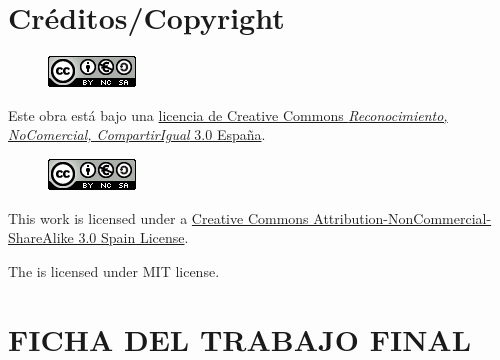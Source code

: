 \setcounter{page}{1} 
\pagestyle{plain}

\chapter*{Créditos/Copyright}

\vspace{1cm}

\begin{figure}[ht]
    \centering
	\includegraphics[scale=1]{images/license.png}
\end{figure}

Este obra está bajo una \href{http://creativecommons.org/licenses/by-nc-sa/3.0/es/}{licencia de Creative Commons \textit{Reconocimiento, NoComercial, CompartirIgual} 3.0 España}.

\begin{figure}[ht]
    \centering
	\includegraphics[scale=1]{images/license.png}
\end{figure}

This work is licensed under a \href{http://creativecommons.org/licenses/by-nc-sa/3.0/es/deed.en}{Creative Commons Attribution-NonCommercial-ShareAlike 3.0 Spain License}.

The  is licensed under MIT license.

\chapter*{FICHA DEL TRABAJO FINAL}

